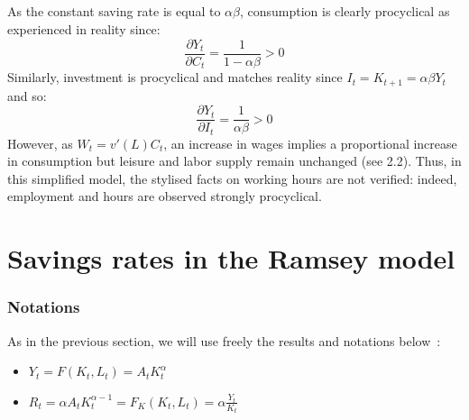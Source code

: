 \documentclass[12pt]{article}
\begin{document}
\subsection{}
As the constant saving rate is equal to $\alpha \beta $, consumption is clearly procyclical as experienced in reality since: 
\begin{equation*}
    \frac{\partial Y_t}{\partial C_t} = \frac{1}{1 - \alpha \beta} > 0
\end{equation*}
Similarly, investment is procyclical and matches reality since $I_t = K_{t+1} = \alpha \beta Y_t$ and so:
\begin{equation*}
    \frac{\partial Y_t}{\partial I_t} = \frac{1}{\alpha \beta} > 0
\end{equation*}
However, as $W_t = v'(L)C_t$, an increase in wages implies a proportional increase in consumption but leisure and labor supply remain unchanged (see 2.2). Thus, in this simplified model, the stylised facts on working hours are not verified: indeed, employment and hours are observed strongly procyclical.  

\section{Savings rates in the Ramsey model}
\subsubsection*{Notations}
As in the previous section, we will use freely the results and notations below~:
\begin{itemize}
    \item $Y_t = F(K_t, L_t) = A_t K_t^{\alpha}$
    \item $\displaystyle R_t = \alpha A_t K_t^{\alpha -1 } = F_K(K_t, L_t) = \alpha \frac{Y_t}{K_t}$
\end{itemize}
\end{document}

